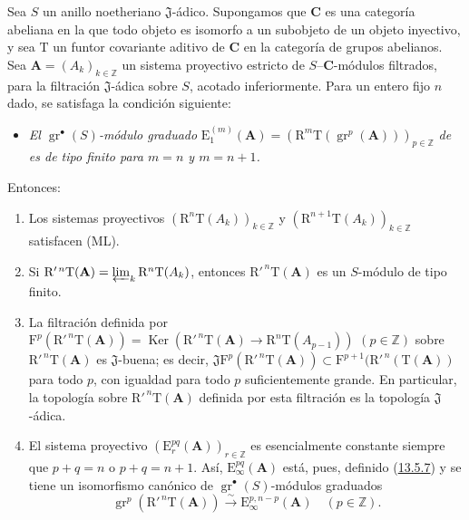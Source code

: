 \begin{proposition}[13.7.7]
\label{0.13.7.7}
\label{0.13.7.7-fr}
Sea $S$ un anillo noetheriano $\mathfrak J$-ádico.
Supongamos que $\boldsymbol{C}$ es una categoría abeliana en la que todo objeto
es isomorfo a un subobjeto de un objeto inyectivo, y sea
$\mathrm T$ un funtor covariante aditivo de $\boldsymbol{C}$ en la
categoría de grupos abelianos.
Sea $\mathbf A=(A_k)_{k\in\mathbb Z}$ un
sistema proyectivo estricto de $S$--$\boldsymbol{C}$-módulos filtrados, para la
filtración $\mathfrak J$-ádica sobre $S$, acotado inferiormente.
Para un entero fijo $n$ dado, se satisfaga la condición siguiente:
\begin{itemize}
\item[$(\mathrm F_n)$]
  \emph{El $\operatorname{gr}^\bullet(S)$-módulo graduado}
  $\mathrm E_1^{(m)}(\mathbf A)=
(\mathrm R^m\mathrm T(\operatorname{gr}^p(\mathbf A)))_{p\in\mathbb Z}$
  \emph{de  es de tipo finito para
  $m=n$ y $m=n+1$.}
\end{itemize}
Entonces:
\begin{enumerate}
  \item[{\rm(i)}] Los sistemas proyectivos
  $(\mathrm R^n\mathrm T(A_k))_{k\in\mathbb Z}$ y
  $(\mathrm R^{n+1}\mathrm T(A_k))_{k\in\mathbb Z}$ satisfacen {\rm(ML)}.
  \item[{\rm(ii)}] Si
  $\mathrm R'^{\,n}\mathrm T(\mathbf A)=
\varprojlim_k\mathrm R^n\mathrm T(A_k)$,
  entonces $\mathrm R'^{\,n}\mathrm T(\mathbf A)$ es un $S$-módulo de tipo finito.
\item[\rm(iii)] La filtración definida por $\mathrm F^p(\mathrm R'^{\,n}\mathrm T(\mathbf A))=
\operatorname{Ker}(\mathrm R'^{\,n}\mathrm T(\mathbf A)
\to\mathrm R^n\mathrm T(A_{p-1}))$ $(p\in\mathbb Z)$ sobre $\mathrm R'^{\,n}\mathrm T(\mathbf A)$ es $\mathfrak J$-buena; es decir,
  $\mathfrak J\mathrm F^p(\mathrm R'^{\,n}\mathrm T(\mathbf A))
\subset\mathrm F^{p+1}(\mathrm R'^{\,n}(\mathrm T(\mathbf A))$
  para todo $p$, con igualdad para todo $p$ suficientemente grande.
  En particular, la topología sobre
  $\mathrm R'^{\,n}\mathrm T(\mathbf A)$ definida por esta filtración es la
  topología $\mathfrak J$-ádica.
  \item[{\rm(iv)}] El sistema proyectivo
  $(\mathrm E_r^{pq}(\mathbf A))_{r\in\mathbb Z}$ es esencialmente constante siempre que
  $p+q=n$ o $p+q=n+1$.
  Así, $\mathrm E_\infty^{pq}(\mathbf A)$ está, pues, definido \textup{(\hyperref[0.13.5.7-fr]{13.5.7})} y se tiene un isomorfismo canónico de $\operatorname{gr}^\bullet(S)$-módulos graduados
\begin{equation}
\label{0.13.7.7.1-fr}
\tag{13.7.7.1}
\operatorname{gr}^p(\mathrm R'^{\,n}\mathrm T(\mathbf A))
\xrightarrow{\sim}\mathrm E_\infty^{p,n-p}(\mathbf A)
\quad(p\in\mathbb Z).
\end{equation}
\end{enumerate}
\end{proposition}

